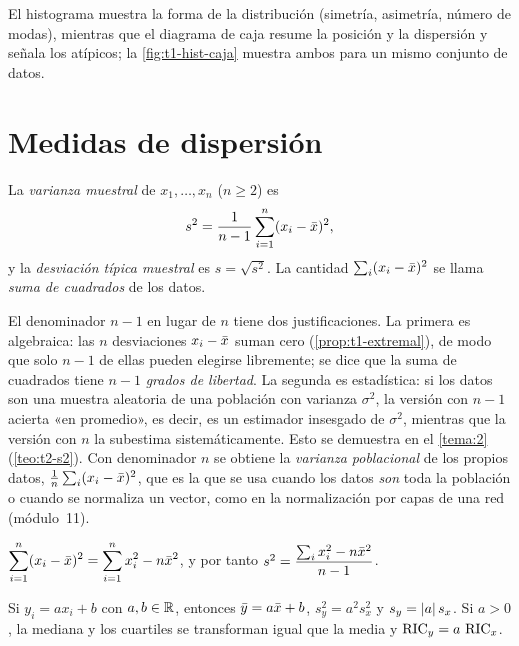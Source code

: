 El histograma muestra la forma de la distribución (simetría, asimetría, número de modas), mientras que el diagrama de caja resume la posición y la dispersión y señala los atípicos; la \cref{fig:t1-hist-caja} muestra ambos para un mismo conjunto de datos.

\section{Medidas de dispersión}

\begin{definicion}\label{def:t1-varianza}
La \emph{varianza muestral} de $x_1,\dots,x_n$ ($n\ge 2$) es
\[
s^{2}=\frac{1}{n-1}\sum_{i=1}^{n}(x_i-\bar{x})^{2},
\]
y la \emph{desviación típica muestral} es $s=\sqrt{s^{2}}$. La cantidad $\sum_i(x_i-\bar{x})^{2}$ se llama \emph{suma de cuadrados} de los datos.
\end{definicion}

\begin{observacion}\label{obs:t1-n-1}
El denominador $n-1$ en lugar de $n$ tiene dos justificaciones. La primera es algebraica: las $n$ desviaciones $x_i-\bar{x}$ suman cero (\cref{prop:t1-extremal}), de modo que solo $n-1$ de ellas pueden elegirse libremente; se dice que la suma de cuadrados tiene $n-1$ \emph{grados de libertad}. La segunda es estadística: si los datos son una muestra aleatoria de una población con varianza $\sigma^{2}$, la versión con $n-1$ acierta «en promedio», es decir, es un estimador insesgado de $\sigma^{2}$, mientras que la versión con $n$ la subestima sistemáticamente. Esto se demuestra en el \cref{tema:2} (\cref{teo:t2-s2}). Con denominador $n$ se obtiene la \emph{varianza poblacional} de los propios datos, $\frac1n\sum_i(x_i-\bar{x})^{2}$, que es la que se usa cuando los datos \emph{son} toda la población o cuando se normaliza un vector, como en la normalización por capas de una red (módulo~11).
\end{observacion}

\begin{proposicion}\label{prop:t1-abreviada}
$\displaystyle\sum_{i=1}^{n}(x_i-\bar{x})^{2}=\sum_{i=1}^{n}x_i^{2}-n\bar{x}^{2}$, y por tanto $s^{2}=\dfrac{\sum_i x_i^{2}-n\bar{x}^{2}}{n-1}$.
\end{proposicion}

\addtocounter{definicion}{1}%

\begin{proposicion}\label{prop:t1-lineal}
Si $y_i=ax_i+b$ con $a,b\in\mathbb{R}$, entonces $\bar{y}=a\bar{x}+b$, $s_y^{2}=a^{2}s_x^{2}$ y $s_y=\lvert a\rvert\,s_x$. Si $a>0$, la mediana y los cuartiles se transforman igual que la media y $\operatorname{RIC}_y=a\,\operatorname{RIC}_x$.
\end{proposicion}

